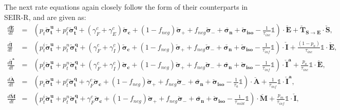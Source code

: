 \documentclass[notitlepage, superscriptaddress]{revtex4-2}
\begin{document}
The next rate equations again closely follow the form of their counterparts in SEIR-R, and are given as:
\begin{eqnarray}
%
\frac{d \boldsymbol{\check{E}}}{dt} &=& \left( p_{t} \boldsymbol{\check{\sigma}^{u}_{t}} + p^{c}_{t} \boldsymbol{\check{\sigma}^{q}_{t}} + (\gamma^{c}_{F} + \gamma^{c}_{E}) \boldsymbol{\check{\sigma}_{c}} + (1-f_{neg}) \boldsymbol{\check{\sigma}_{+}} + f_{neg} \boldsymbol{\check{\sigma}_{-}} + \boldsymbol{\check{\sigma_{n}}} + \boldsymbol{\check{\sigma}_{iso}} - \frac{1}{\tau_{inc}} \mathbb{1} \right) \cdot \boldsymbol{\check{E}} + \boldsymbol{\check{T}_{S \rightarrow E}} \cdot \boldsymbol{\check{S}}, \\
%
\frac{d \boldsymbol{\check{I}}}{dt} &=& \left( p^{i}_{t} \boldsymbol{\check{\sigma}^{u}_{t}} + p^{n}_{t} \boldsymbol{\check{\sigma}^{q}_{t}} + (\gamma^{c}_{F} + \gamma^{c}_{I}) \boldsymbol{\check{\sigma}_{c}} + (1-f_{neg}) \boldsymbol{\check{\sigma}_{+}} + f_{neg} \boldsymbol{\check{\sigma}_{-}} + \boldsymbol{\check{\sigma_{n}}} + \boldsymbol{\check{\sigma}_{iso}} - \frac{1}{\tau_{inf}} \mathbb{1} \right) \cdot \boldsymbol{\check{I}} + \frac{(1-p_{a})}{\tau_{inc}} \mathbb{1} \cdot \boldsymbol{\check{E}}, \\ 
%
\frac{d \boldsymbol{\check{I}^{a}}}{dt} &=& \left( p^{i}_{t} \boldsymbol{\check{\sigma}^{u}_{t}} + p^{n}_{t} \boldsymbol{\check{\sigma}^{q}_{t}} + (\gamma^{c}_{F} + \gamma^{c}_{I}) \boldsymbol{\check{\sigma}_{c}} + (1-f_{neg}) \boldsymbol{\check{\sigma}_{+}} + f_{neg} \boldsymbol{\check{\sigma}_{-}} + \boldsymbol{\check{\sigma_{n}}} + \boldsymbol{\check{\sigma}_{iso}} - \frac{1}{\tau_{inf}} \mathbb{1} \right) \cdot \boldsymbol{\check{I}^{a}} + \frac{p_{a}}{\tau_{inc}} \mathbb{1} \cdot \boldsymbol{\check{E}}, \\
%
\frac{d \boldsymbol{\check{A}}}{dt} &=& \left( p_{t} \boldsymbol{\check{\sigma}^{u}_{t}} + p^{c}_{t} \boldsymbol{\check{\sigma}^{q}_{t}} + \gamma^{c}_{F} \boldsymbol{\check{\sigma}_{c}} + (1-f_{neg}) \boldsymbol{\check{\sigma}_{+}} + f_{neg} \boldsymbol{\check{\sigma}_{-}} + \boldsymbol{\check{\sigma_{n}}} + \boldsymbol{\check{\sigma}_{iso}} - \frac{1}{\tau_{a}} \mathbb{1} \right) \cdot \boldsymbol{\check{A}} + \frac{1}{\tau_{inf}} \mathbb{1} \cdot \boldsymbol{\check{I}^{a}}, \\
%
\frac{d \boldsymbol{\check{M}}}{dt} &=& \left( p^{i}_{t} \boldsymbol{\check{\sigma}^{u}_{t}} + p^{n}_{t} \boldsymbol{\check{\sigma}^{q}_{t}} + \gamma^{c}_{F} \boldsymbol{\check{\sigma}_{c}} + (1-f_{neg}) \boldsymbol{\check{\sigma}_{+}} + f_{neg} \boldsymbol{\check{\sigma}_{-}} + \boldsymbol{\check{\sigma_{n}}} + \boldsymbol{\check{\sigma}_{iso}} - \frac{1}{\tau_{mild}} \mathbb{1} \right) \cdot \boldsymbol{\check{M}} + \frac{p_{m}}{\tau_{inf}} \mathbb{1} \cdot \boldsymbol{\check{I}}, \\ 

\end{eqnarray}
\end{document}
